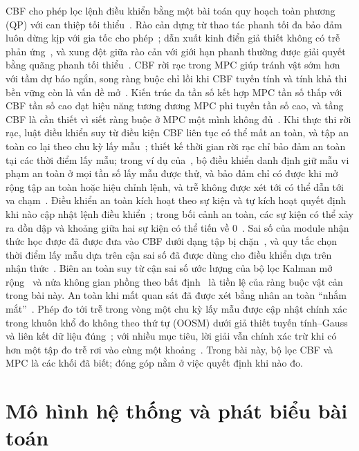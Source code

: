\documentclass[11pt,a4paper]{article}
\theoremstyle{plain}
\theoremstyle{definition}
\theoremstyle{remark}
\begin{document}
CBF cho phép lọc lệnh điều khiển bằng một bài toán quy hoạch toàn phương (QP) với can thiệp tối thiểu~\cite{ames2017,ames2019}. Rào cản dựng từ thao tác phanh tối đa bảo đảm luôn dừng kịp với gia tốc cho phép~\cite{ames2017,wang2017}; dẫn xuất kinh điển giả thiết không có trễ phản ứng~\cite{ames2017}, và xung đột giữa rào cản với giới hạn phanh thường được giải quyết bằng quãng phanh tối thiểu~\cite{xiao2019}. CBF rời rạc trong MPC giúp tránh vật sớm hơn với tầm dự báo ngắn, song ràng buộc chỉ lồi khi CBF tuyến tính và tính khả thi bền vững còn là vấn đề mở~\cite{zeng2021}. Kiến trúc đa tần số kết hợp MPC tần số thấp với CBF tần số cao đạt hiệu năng tương đương MPC phi tuyến tần số cao, và tầng CBF là cần thiết vì siết ràng buộc ở MPC một mình không đủ~\cite{rosolia2020}. Khi thực thi rời rạc, luật điều khiển suy từ điều kiện CBF liên tục có thể mất an toàn, và tập an toàn co lại theo chu kỳ lấy mẫu~\cite{breeden2022}; thiết kế thời gian rời rạc chỉ bảo đảm an toàn tại các thời điểm lấy mẫu; trong ví dụ của~\cite{bahati2024}, bộ điều khiển danh định giữ mẫu vi phạm an toàn ở mọi tần số lấy mẫu được thử, và bảo đảm chỉ có được khi mở rộng tập an toàn hoặc hiệu chỉnh lệnh, và trễ không được xét tới có thể dẫn tới va chạm~\cite{molnar2022}. Điều khiển an toàn kích hoạt theo sự kiện và tự kích hoạt quyết định khi nào cập nhật lệnh điều khiển~\cite{taylor2020,yang2019}; trong bối cảnh an toàn, các sự kiện có thể xảy ra dồn dập và khoảng giữa hai sự kiện có thể tiến về 0~\cite{taylor2020}. Sai số của module nhận thức học được đã được đưa vào CBF dưới dạng tập bị chặn~\cite{dean2021}, và quy tắc chọn thời điểm lấy mẫu dựa trên cận sai số đã được dùng cho điều khiển dựa trên nhận thức~\cite{yang2023}. Biên an toàn suy từ cận sai số ước lượng của bộ lọc Kalman mở rộng~\cite{yaghoubi2021} và nửa không gian phồng theo bất định~\cite{zhu2019} là tiền lệ của ràng buộc vật cản trong bài này. An toàn khi mất quan sát đã được xét bằng nhân an toàn ``nhắm mắt''~\cite{laine2020}. Phép đo tới trễ trong vòng một chu kỳ lấy mẫu được cập nhật chính xác trong khuôn khổ đo không theo thứ tự (OOSM) dưới giả thiết tuyến tính--Gauss và liên kết dữ liệu đúng~\cite{barshalom2002}; với nhiều mục tiêu, lời giải vẫn chính xác trừ khi có hơn một tập đo trễ rơi vào cùng một khoảng~\cite{garcia2021}. Trong bài này, bộ lọc CBF và MPC là các khối đã biết; đóng góp nằm ở việc quyết định khi nào đo.

\section{Mô hình hệ thống và phát biểu bài toán}\label{sec:model}
\end{document}
